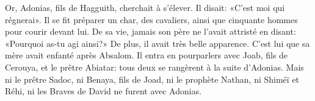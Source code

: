 Or, Adonias, fils de Hagguith, cherchait à s’élever.
	Il disait: «C’est moi qui régnerai».
Il se fit préparer un char, des cavaliers,
	ainsi que cinquante hommes pour courir devant lui.
De sa vie, jamais son père ne l’avait attristé en disant:
	«Pourquoi as-tu agi ainsi?»
De plus, il avait très belle apparence.
	C’est lui que sa mère avait enfanté après Absalom.
Il entra en pourparlers avec Joab, fils de Cerouya, et le prêtre Abiatar:
	tous deux se rangèrent à la suite d’Adonias.
Mais ni le prêtre Sadoc, ni Benaya, fils de Joad, ni le prophète Nathan,
	ni Shiméï et Réhi, ni les Braves de David ne furent avec Adonias.
